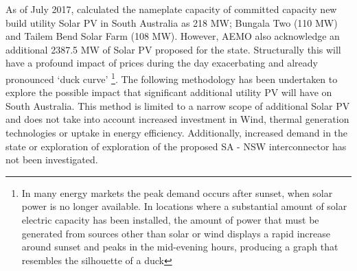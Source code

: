As of July 2017, \textcite{sa_aemo} calculated the nameplate capacity of committed capacity new build utility Solar PV in South Australia as 218 MW; Bungala Two (110 MW) and Tailem Bend Solar Farm (108 MW). However, AEMO also acknowledge an additional 2387.5 MW of Solar PV proposed for the state. Structurally this will have a profound impact of prices during the day exacerbating and already pronounced `duck curve' \footnote{In many energy markets the peak demand occurs after sunset, when solar power is no longer available. In locations where a substantial amount of solar electric capacity has been installed, the amount of power that must be generated from sources other than solar or wind displays a rapid increase around sunset and peaks in the mid-evening hours, producing a graph that resembles the silhouette of a duck}. The following methodology has been undertaken to explore the possible impact that significant additional utility PV will have on South Australia. This method is limited to a narrow scope of additional Solar PV and does not take into account increased investment in Wind, thermal generation technologies or uptake in energy efficiency. Additionally, increased demand in the state or exploration of exploration of the proposed SA - NSW interconnector has not been investigated. 
